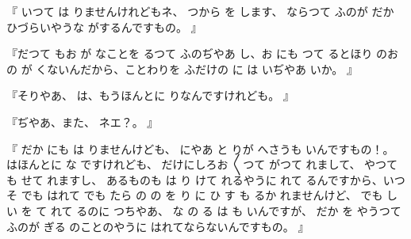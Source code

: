 『
いつて
は
りませんけれどもネ、
つから
を
します、
ならつて
ふのが
だか
ひづらいやうな
がするんですもの。
』

『だつて
もお
が
なことを
るつて
ふのぢやあ
し、お
にも
つて
るとほり
のお
の
が
くないんだから、ことわりを
ふだけの
に
は
いぢやあ
いか。
』

『そりやあ、
は、もうほんとに
りなんですけれども。
』

『ぢやあ、また、
ネエ？。
』

『
だか
にも
は
りませんけども、
にやあ
と
りが
へさうも
いんですもの！。
はほんとに
な
ですけれども、
だけにしろお
〳〵つて
がつて
れまして、
やつて
も
せて
れますし、
あるものも
は
り
けて
れるやうに
れて
るんですから、いつそ
でも
はれて
でも
たら
の
の
を
り
に
ひ
す
も
るか
れませんけど、
でも
しい
を
て
れて
るのに
つちやあ、
な
の
る
は
も
いんですが、
だか
を
やうつて
ふのが
ぎる
のことのやうに
はれてならないんですもの。
』

